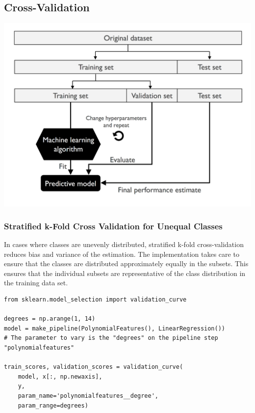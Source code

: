 \documentclass[11pt]{article}
\theoremstyle{definition}
\begin{document}
\subsection{Cross-Validation}
\begin{center}
	\includegraphics[width=0.7\linewidth]{img/cross_validation_hyperparameter_tuning}
\end{center}
\subsubsection{Stratified k-Fold Cross Validation for Unequal Classes}
In cases where classes are unevenly distributed, {\color{DodgerBlue3} stratified k-fold cross-validation} reduces bias and variance of the estimation. The implementation takes care to ensure that the classes are distributed approximately equally in the subsets. This ensures that the individual subsets are representative of the class distribution in the training data set.

\begin{verbatim}
from sklearn.model_selection import validation_curve

degrees = np.arange(1, 14)
model = make_pipeline(PolynomialFeatures(), LinearRegression())
# The parameter to vary is the "degrees" on the pipeline step "polynomialfeatures"

train_scores, validation_scores = validation_curve(
	model, x[:, np.newaxis],
	y,
	param_name='polynomialfeatures__degree',
	param_range=degrees)
\end{verbatim}
\end{document}
